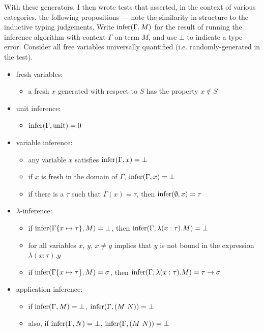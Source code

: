 With these generators, I then wrote tests that asserted, in the context of various categories, the following propositions --- note the similarity in structure to the inductive typing judgements.
Write \(\mathrm{infer}(\Gamma, M)\) for the result of running the inference algorithm with context \(\Gamma\) on term \(M\), and use \(\bot\) to indicate a type error.
Consider all free variables universally quantified (i.e. randomly-generated in the test).
\begin{itemize}
\item fresh variables:
\begin{itemize}
\item a fresh \(x\) generated with respect to \(S\) has the property \(x \notin S\)
\end{itemize}
\item unit inference:
\begin{itemize}
\item \(\mathrm{infer}(\Gamma, \mathrm{unit}) = 0\)
\end{itemize}
\item variable inference:
\begin{itemize}
\item any variable \(x\) satisfies \(\mathrm{infer}(\Gamma, x) = \bot\)
\item if \(x\) is fresh in the domain of \(\Gamma\), \(\mathrm{infer}(\Gamma, x) = \bot\)
\item if there is a \(\tau\) such that \(\Gamma(x) = \tau\), then \(\mathrm{infer}(\emptyset, x) = \tau\)
\end{itemize}
\item \(\lambda\)-inference:
\begin{itemize}
\item if \(\mathrm{infer}(\Gamma\{x \mapsto \tau\}, M) = \bot\), then \(\mathrm{infer}(\Gamma, \lambda (x : \tau). M) = \bot\)
\item for all variables \(x\), \(y\), \(x \neq y\) implies that \(y\) is not bound in the expression \(\lambda (x : \tau). y\)
\item if \(\mathrm{infer}(\Gamma\{x \mapsto \tau\}, M) = \sigma\), then \(\mathrm{infer}(\Gamma,\lambda (x : \tau). M) = \tau \to \sigma\)
\end{itemize}
\item application inference:
\begin{itemize}
\item if \(\mathrm{infer}(\Gamma, M) = \bot\), \(\mathrm{infer}(\Gamma, (M\ N)) = \bot\)
\item also, if \(\mathrm{infer}(\Gamma, N) = \bot\), \(\mathrm{infer}(\Gamma, (M\ N)) = \bot\)

\end{itemize}
\end{itemize}
